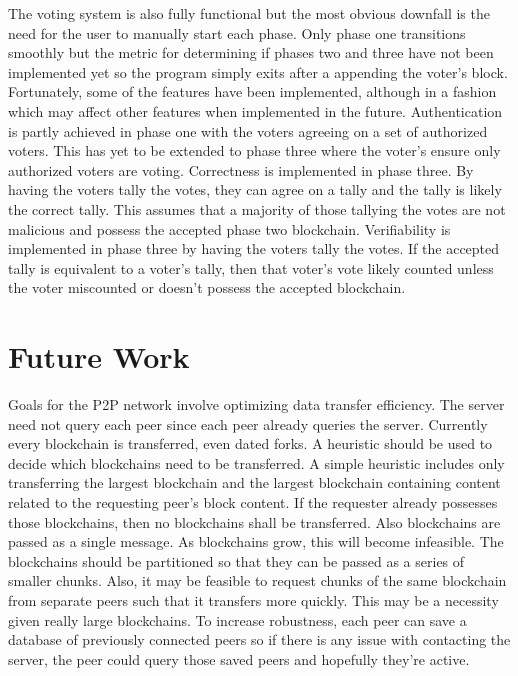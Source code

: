 \documentclass[conference]{IEEEtran}
\begin{document}
The voting system is also fully functional but the most obvious downfall is the need for the user to manually start each phase. Only phase one transitions smoothly but the metric for determining if phases two and three have not been implemented yet so the program simply exits after a appending the voter's block. Fortunately, some of the features have been implemented, although in a fashion which may affect other features when implemented in the future. Authentication is partly achieved in phase one with the voters agreeing on a set of authorized voters. This has yet to be extended to phase three where the voter's ensure only authorized voters are voting. Correctness is implemented in phase three. By having the voters tally the votes, they can agree on a tally and the tally is likely the correct tally. This assumes that a majority of those tallying the votes are not malicious and possess the accepted phase two blockchain. Verifiability is implemented in phase three by having the voters tally the votes. If the accepted tally is equivalent to a voter's tally, then that voter's vote likely counted unless the voter miscounted or doesn't possess the accepted blockchain. 

\section{Future Work}
Goals for the P2P network involve optimizing data transfer efficiency. The server need not query each peer since each peer already queries the server. Currently every blockchain is transferred, even dated forks. A heuristic should be used to decide which blockchains need to be transferred. A simple heuristic includes only transferring the largest blockchain and the largest blockchain containing content related to the requesting peer's block content. If the requester already possesses those blockchains, then no blockchains shall be transferred. Also blockchains are passed as a single message. As blockchains grow, this will become infeasible. The blockchains should be partitioned so that they can be passed as a series of smaller chunks. Also, it may be feasible to request chunks of the same blockchain from separate peers such that it transfers more quickly. This may be a necessity given really large blockchains. To increase robustness, each peer can save a database of previously connected peers so if there is any issue with contacting the server, the peer could query those saved peers and hopefully they're active. 
\end{document}
